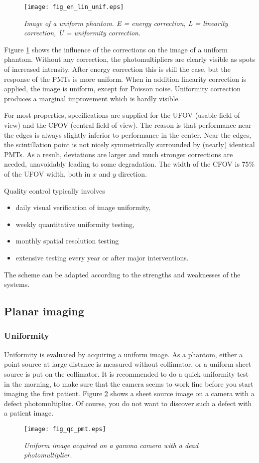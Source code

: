 \begin{figure}[tb]
\centering
\texttt{[image: fig\_en\_lin\_unif.eps]}
\caption{\label{fig:en_lin_unif} \emph{Image of a uniform phantom. E = energy
correction, L = linearity correction, U = uniformity correction.}}
\end{figure}
%
Figure \ref{fig:en_lin_unif} shows the influence of the corrections on the
image of a uniform phantom. Without any correction, the photomultipliers are
clearly visible as spots of increased intensity. After energy correction this
is still the case, but the response of the PMTs is more uniform. When in
addition linearity correction is applied, the image is uniform, except for
Poisson noise. Uniformity correction produces a marginal improvement which is
hardly visible.

For most properties, specifications are supplied for the UFOV (usable field of
view) and the CFOV (central field of view). The reason is that performance
near the edges is always slightly inferior to performance in the center. Near
the edges, the scintillation point is not nicely symmetrically surrounded by
(nearly) identical PMTs. As a result, deviations are larger and much stronger
corrections are needed, unavoidably leading to some degradation. The width of
the CFOV is 75\% of the UFOV width, both in $x$ and $y$ direction. 

Quality control typically involves
\begin{itemize}
  \item daily visual verification of image uniformity,
  \item weekly quantitative uniformity testing,
  \item monthly spatial resolution testing
  \item extensive testing every year or after major interventions.
\end{itemize}
The scheme can be adapted according to the strengths and weaknesses of the
systems.


\subsection{Planar imaging}
\subsubsection{Uniformity}
Uniformity is evaluated by acquiring a uniform image. As a phantom, either
a point source at large distance is measured without collimator, or a
uniform sheet source is put on the collimator. It is recommended to do a quick
uniformity test in the morning, to make sure that the camera seems to work
fine before you start imaging the first patient. Figure \ref{fig:qc_pmt} shows
a sheet source image on a camera with a defect photomultiplier. Of course, you
do not want to discover such a defect with a patient image.
%
\begin{figure}[tb]
\centering
\texttt{[image: fig\_qc\_pmt.eps]}
\caption{\label{fig:qc_pmt} \emph{Uniform image acquired on a gamma camera
with a dead photomultiplier.}}
\end{figure}

